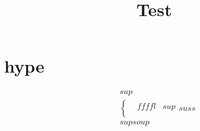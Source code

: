 \documentclass{book}
\title{
  Test
}
\begin{document}
\maketitle

\part{hype}
\begin{align*}
  & sup \\
  & \begin{cases}
  & ffffl & sup \\
  \end{cases} suss\\
  & sup

soup

\end{align*}
\end{document}

